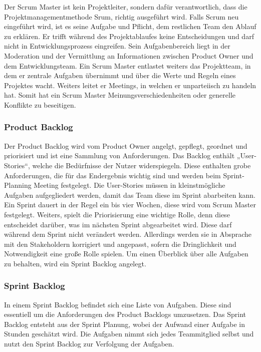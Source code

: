 Der Scrum Master ist kein Projektleiter, sondern dafür verantwortlich, dass die Projektmanagementmethode Srum, richtig ausgeführt wird. Falls Scrum neu eingeführt wird, ist es seine Aufgabe und Pflicht, dem restlichen Team den Ablauf zu erklären. Er trifft während des Projektablaufes keine Entscheidungen und darf nicht in Entwicklungsprozess eingreifen. Sein Aufgabenbereich liegt in der Moderation und der Vermittlung an Informationen zwischen Product Owner und dem Entwicklungsteam. Ein Scrum Master entlastet weiters das Projektteam, in dem er zentrale Aufgaben übernimmt und über die Werte und Regeln eines Projektes wacht. Weiters leitet er Meetings, in welchen er unparteiisch zu handeln hat. Somit hat ein Scrum Master Meinungsverschiedenheiten oder generelle Konflikte zu beseitigen. 

\subsubsection{Product Backlog} 
Der Product Backlog wird vom Product Owner angelgt, gepflegt, geordnet und priorisiert und ist eine Sammlung von Anforderungen. Das Backlog enthält „User-Stories“, welche die Bedürfnisse der Nutzer widerspiegeln. Diese enthalten grobe Anforderungen, die für das Endergebnis wichtig sind und werden beim Sprint-Planning Meeting festgelegt. Die User-Stories müssen in kleinstmögliche Aufgaben aufgegliedert werden, damit das Team diese im Sprint abarbeiten kann. Ein Sprint dauert in der Regel ein bis vier Wochen, diese wird vom Scrum Master festgelegt. Weiters, spielt die Priorisierung eine wichtige Rolle, denn diese entscheidet darüber, was im nächsten Sprint abgearbeitet wird. Diese darf während dem Sprint nicht verändert werden. Allerdings werden sie in Absprache mit den Stakeholdern korrigiert und angepasst, sofern die Dringlichkeit und Notwendigkeit eine große Rolle spielen. Um einen Überblick über alle Aufgaben zu behalten, wird ein Sprint Backlog angelegt. 

\subsubsection{Sprint Backlog} 
In einem Sprint Backlog befindet sich eine Liste von Aufgaben. Diese sind essentiell um die Anforderungen des Product Backlogs umzusetzen. Das Sprint Backlog entsteht aus der Sprint Planung, wobei der Aufwand einer Aufgabe in Stunden geschätzt wird. Die Aufgaben nimmt sich jedes Teammitglied selbst und nutzt den Sprint Backlog zur Verfolgung der Aufgaben. 

